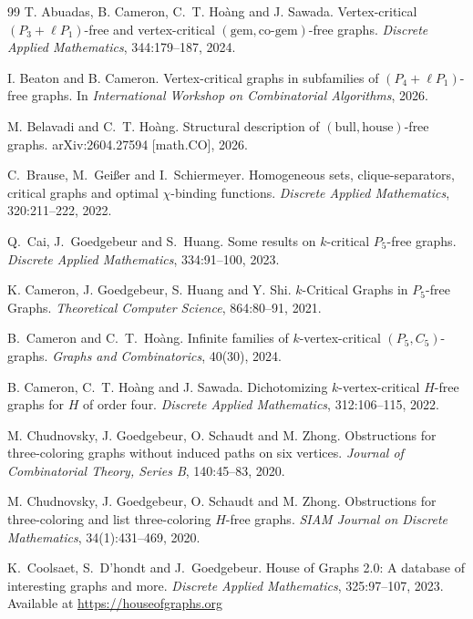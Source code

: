 \documentclass[10pt]{article}
\theoremstyle{definition}
\begin{document}
	\begin{thebibliography}{99}
T. Abuadas, B. Cameron, C.~T. Ho\`{a}ng and J. Sawada.
Vertex-critical $(P_3 +
\ell P_1)$-free and vertex-critical $(\text{gem},\text{co-gem})$-free graphs.
\textit{Discrete Applied Mathematics}, 344:179--187, 2024.

I. Beaton and B. Cameron.
Vertex-critical graphs in subfamilies of $(P_4+\ell P_1)$-free graphs.
In \textit{International Workshop on Combinatorial Algorithms}, 2026. 

M. Belavadi and C.~T. Ho\`{a}ng.
Structural description of $(\text{bull}, \text{house})$-free graphs.
arXiv:2604.27594 [math.CO], 2026.


C.~Brause, M.~Gei{\ss}er and I.~Schiermeyer.
Homogeneous sets, clique-separators, critical graphs and optimal
$\chi$-binding functions.
\textit{Discrete Applied Mathematics}, 320:211--222, 2022.

Q.~Cai, J.~Goedgebeur and S.~Huang.
Some results on $k$-critical $P_5$-free graphs.
\textit{Discrete Applied Mathematics}, 334:91--100, 2023.
        
K. Cameron, J. Goedgebeur, S. Huang and Y. Shi.
$k$-Critical Graphs in $P_5$-free Graphs.
\textit{Theoretical Computer Science}, 864:80--91, 2021.

B.~Cameron and C.~T.~Ho\`ang.
Infinite families of $k$-vertex-critical $({P}_5,{C}_5)$-graphs.
\textit{Graphs and Combinatorics}, 40(30), 2024.

B. Cameron, C.~T. Ho\`{a}ng and J. Sawada.
Dichotomizing $k$-vertex-critical $H$-free graphs for $H$ of order four.
\textit{Discrete Applied Mathematics}, 312:106--115, 2022.
     
M. Chudnovsky, J. Goedgebeur, O. Schaudt and M. Zhong.
Obstructions for three-coloring graphs without induced paths on six vertices.
\textit{Journal of Combinatorial Theory, Series B}, 140:45--83, 2020.

M. Chudnovsky, J. Goedgebeur, O. Schaudt and M. Zhong.
Obstructions for three-coloring and list three-coloring $H$-free graphs.
\textit{SIAM Journal on Discrete Mathematics}, 34(1):431--469, 2020.

K.~Coolsaet, S.~D'hondt and J.~Goedgebeur.
House of Graphs 2.0: A database of interesting graphs and more.
\textit{Discrete Applied Mathematics}, 325:97--107, 2023. Available at \url{https://houseofgraphs.org}
        

\end{thebibliography}
\end{document}
